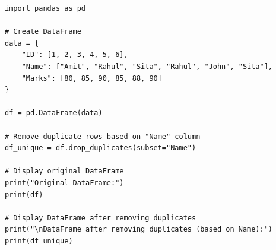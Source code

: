 \begin{verbatim}
import pandas as pd

# Create DataFrame
data = {
    "ID": [1, 2, 3, 4, 5, 6],
    "Name": ["Amit", "Rahul", "Sita", "Rahul", "John", "Sita"],
    "Marks": [80, 85, 90, 85, 88, 90]
}

df = pd.DataFrame(data)

# Remove duplicate rows based on "Name" column
df_unique = df.drop_duplicates(subset="Name")

# Display original DataFrame
print("Original DataFrame:")
print(df)

# Display DataFrame after removing duplicates
print("\nDataFrame after removing duplicates (based on Name):")
print(df_unique)
\end{verbatim}